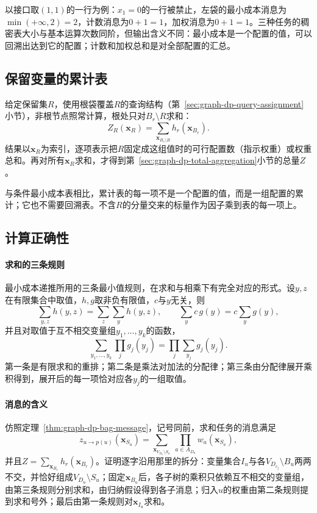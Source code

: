 以接口取$(1,1)$的一行为例：$x_1=0$的一行被禁止，左袋的最小成本消息为$\min(+\infty,2)=2$，计数消息为$0+1=1$，加权消息为$0+1=1$。三种任务的稠密表大小与基本运算次数同阶，但输出含义不同：最小成本是一个配置的值，可以回溯出达到它的配置；计数和加权总和是对全部配置的汇总。

\subsection{保留变量的累计表}
\label{sec:graph-dp-retained-aggregation}

给定保留集$R$，使用根袋覆盖$R$的查询结构（第~\ref{sec:graph-dp-query-assignment}小节），非根节点照常计算，根处只对$B_r\setminus R$求和：
\begin{equation}
Z_R(\bm x_R)=\sum_{\bm x_{B_r\setminus R}}h_r(\bm x_{B_r}).
\label{eq:graph-dp-retained-sum}
\end{equation}
结果以$\bm x_R$为索引，逐项表示把$R$固定成这组值时的可行配置数（指示权重）或权重总和。再对所有$\bm x_R$求和，才得到第~\ref{sec:graph-dp-total-aggregation}小节的总量$Z$。

与条件最小成本表相比，累计表的每一项不是一个配置的值，而是一组配置的累计；它也不需要回溯表。不含$R$的分量交来的标量作为因子乘到表的每一项上。

\subsection{计算正确性}
\label{sec:graph-dp-sum-correctness}

\paragraph{求和的三条规则}
最小成本递推所用的三条最小值规则，在求和与相乘下有完全对应的形式。设$y,z$在有限集合中取值，$h,g$取非负有限值，$c$与$y$无关，则
\[
\sum_{y,z}h(y,z)=\sum_z\sum_y h(y,z),\qquad \sum_y c\,g(y)=c\sum_y g(y),
\]
并且对取值于互不相交变量组$y_1,\ldots,y_k$的函数，
\[
\sum_{y_1,\ldots,y_k}\prod_j g_j(y_j)=\prod_j\sum_{y_j}g_j(y_j).
\]
第一条是有限求和的重排；第二条是乘法对加法的分配律；第三条由分配律展开乘积得到，展开后的每一项恰对应各$y_j$的一组取值。

\paragraph{消息的含义}
仿照定理~\ref{thm:graph-dp-bag-message}，记号同前，求和任务的消息满足
\[
z_{u\to p(u)}(\bm x_{S_u})=\sum_{\bm x_{V_{D_u}\setminus S_u}}\ \prod_{a\in A_{D_u}}w_a(\bm x_{S_a}),
\]
并且$Z=\sum_{\bm x_{B_r}}h_r(\bm x_{B_r})$。证明逐字沿用那里的拆分：变量集合$I_u$与各$V_{D_{c_j}}\setminus B_u$两两不交，并恰好组成$V_{D_u}\setminus S_u$；固定$\bm x_{B_u}$后，各子树的乘积只依赖互不相交的变量组，由第三条规则分别求和，由归纳假设得到各子消息；归入$u$的权重由第二条规则提到求和号外；最后由第一条规则对$\bm x_{I_u}$求和。

